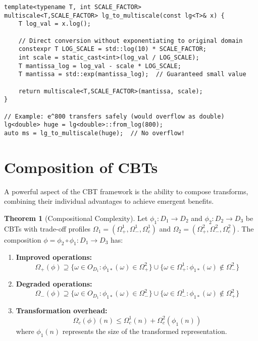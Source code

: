 \documentclass[11pt]{article}
\theoremstyle{definition}
\newtheorem{theorem}{Theorem}
\begin{document}
\begin{lstlisting}[caption={Direct lg to multiscale mapping avoiding overflow}]
template<typename T, int SCALE_FACTOR>
multiscale<T,SCALE_FACTOR> lg_to_multiscale(const lg<T>& x) {
    T log_val = x.log();
    
    // Direct conversion without exponentiating to original domain
    constexpr T LOG_SCALE = std::log(10) * SCALE_FACTOR;
    int scale = static_cast<int>(log_val / LOG_SCALE);
    T mantissa_log = log_val - scale * LOG_SCALE;
    T mantissa = std::exp(mantissa_log);  // Guaranteed small value
    
    return multiscale<T,SCALE_FACTOR>(mantissa, scale);
}

// Example: e^800 transfers safely (would overflow as double)
lg<double> huge = lg<double>::from_log(800);
auto ms = lg_to_multiscale(huge);  // No overflow!
\end{lstlisting}

\section{Composition of CBTs}
\label{sec:composition}

A powerful aspect of the CBT framework is the ability to compose transforms, combining their individual advantages to achieve emergent benefits.

\begin{theorem}[Compositional Complexity]
\label{thm:composition}
Let $\phi_1: D_1 \to D_2$ and $\phi_2: D_2 \to D_3$ be CBTs with trade-off profiles $\Omega_1 = (\Omega_+^1, \Omega_-^1, \Omega_c^1)$ and $\Omega_2 = (\Omega_+^2, \Omega_-^2, \Omega_c^2)$. The composition $\phi = \phi_2 \circ \phi_1: D_1 \to D_3$ has:
\begin{enumerate}
\item \textbf{Improved operations:}
\begin{equation}
\Omega_+(\phi) \supseteq \{\omega \in O_{D_1} : \phi_{1*}(\omega) \in \Omega_+^2\} \cup \{\omega \in \Omega_+^1 : \phi_{1*}(\omega) \notin \Omega_-^2\}
\end{equation}
\item \textbf{Degraded operations:}
\begin{equation}
\Omega_-(\phi) \supseteq \{\omega \in O_{D_1} : \phi_{1*}(\omega) \in \Omega_-^2\} \cup \{\omega \in \Omega_-^1 : \phi_{1*}(\omega) \notin \Omega_+^2\}
\end{equation}
\item \textbf{Transformation overhead:}
\begin{equation}
\Omega_c(\phi)(n) \leq \Omega_c^1(n) + \Omega_c^2(\phi_1(n))
\end{equation}
where $\phi_1(n)$ represents the size of the transformed representation.
\end{enumerate}
\end{theorem}
\end{document}
